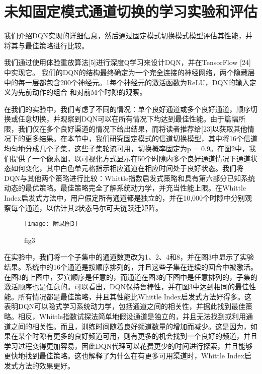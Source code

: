 \section*{ 未知固定模式通道切换的学习实验和评估  }
我们介绍DQN实现的详细信息，然后通过固定模式切换模式模型评估其性能，并将其与最佳策略进行比较。

我们通过使用体验重放算法[5]进行深度Q学习来设计DQN，并在TensorFlow [24]中实现它。 我们的DQN的结构最终确定为一个完全连接的神经网络，两个隐藏层中的每一层都包含200个神经元。1每个神经元的激活函数为ReLU，DQN的输入定义为先前动作的组合 和对前M个时隙的观察。

在我们的实验中，我们考虑了不同的情况：单个良好通道或多个良好通道，顺序切换或任意切换，并观察到DQN可以在所有情况下均达到最佳性能。由于篇幅所限，我们仅在多个良好渠道的情况下给出结果，而将读者推荐给[23]以获取其他情况下的更多结果。在本节中，我们研究固定模式的信道切换模型，其中将16个信道均匀地分成几个子集，这些子集轮流可用，切换概率固定为p = 0.9。在图2中，我们提供了一个像素图，以可视化方式显示在50个时隙内多个良好通道情况下通道状态如何变化，其中白色单元格指示相应通道在相应时间处于良好状态。我们将DQN与其他两个策略进行比较：Whittle指数启发式策略和具有第六部分已知系统动态的最优策略。最佳策略完全了解系统动力学，并充当性能上限。在Whittle Index启发式方法中，用户假定所有通道都是独立的，并在10,000个时隙中分别观察每个通道，以估计其2状态马尔可夫链跃迁矩阵。
\begin{figure}[h]
	\centering
	\texttt{[image: 附录图3]}
	\caption{fig3}
\end{figure}

在实验中，我们将一个子集中的通道数更改为1、2、4和8，并在图3中显示了实验结果。系统中的16个通道是按顺序排列的，并且这些子集在连续的回合中被激活。在图3的上图中，罗宾顺序是任意的，而通道在图3的下图中是任意排列的，子集的激活顺序也是任意的。可以看出，DQN保持鲁棒性，并在图3中达到相同的最佳性能。所有情况都是最佳策略，并且其性能比Whittle Index启发式方法好得多。这表明DQN可以隐式学习系统动力学，包括通道之间的相关性，并据此找到最佳策略。相反，Whittle指数试探法简单地假设通道是独立的，并且无法找到或利用通道之间的相关性。而且，训练时间随着良好频道数量的增加而减少。这是因为，如果在某个时隙有更多的良好频道可用，则有更多的机会找到一个良好的频道，并且学习过程变得更加容易，因此DQN代理可以花费更少的时间进行探索，并且能够更快地找到最佳策略。这也解释了为什么在有更多可用渠道时，Whittle Index启发式方法的效果更好。

